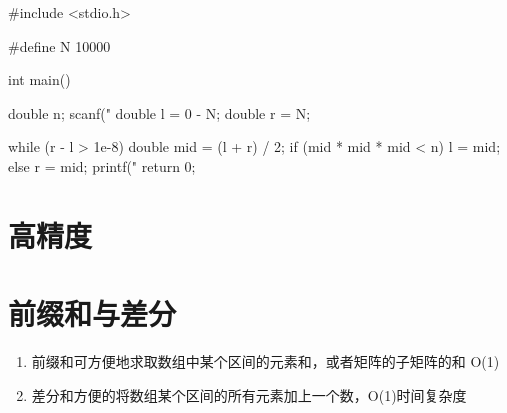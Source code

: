 \begin{mycpptwocol}[数的三次方根]
    #include <stdio.h>

    #define N 10000

    int main() {
        double n;
        scanf("%
        double l = 0 - N;
        double r = N;

        while (r - l > 1e-8) {
            double mid = (l + r) / 2;
            if (mid * mid * mid < n) {
                l = mid;
            } else {
                r = mid;
            }
        }
        printf("%
        return 0;
    }
\end{mycpptwocol}


\section{高精度}


\section{前缀和与差分}
\begin{enumerate}
    \item 前缀和可方便地求取数组中某个区间的元素和，或者矩阵的子矩阵的和 O(1)
    \item 差分和方便的将数组某个区间的所有元素加上一个数，O(1)时间复杂度
\end{enumerate}

